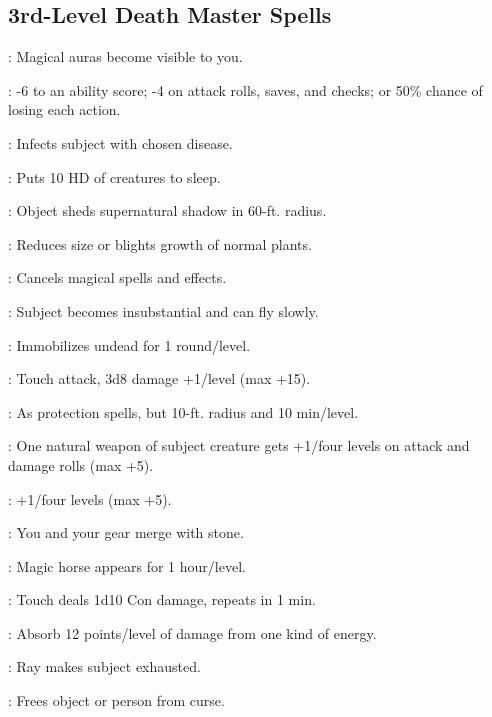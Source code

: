 \begin{multicols}{2}
\subsection{3rd-Level Death Master Spells}
\begin{description*}
\item[\linkspell{Arcane Sight}:] Magical auras become visible to you.
\item[\linkspell{Bestow Curse}:] -6 to an ability score; -4 on attack rolls, saves, and checks; or 50\% chance of losing each action.
\item[\linkspell{Contagion}:] Infects subject with chosen disease.
\item[\linkspell{Deep Slumber}:] Puts 10 HD of creatures to sleep.
\item[\linkspell{Deeper Darkness}:] Object sheds supernatural shadow in 60-ft. radius.
\item[\linkspell{Diminish Plants}:] Reduces size or blights growth of normal plants.
\item[\linkspell{Dispel Magic}:] Cancels magical spells and effects.
\item[\linkspell{Gaseous Form}:] Subject becomes insubstantial and can fly slowly.
\item[\linkspell{Halt Undead}:] Immobilizes undead for 1 round/level.
\item[\linkspell{Inflict Serious Wounds}:] Touch attack, 3d8 damage +1/level (max +15).
\item[\linkspell{Magic Circle Against Good}:] As protection spells, but 10-ft. radius and 10 min/level.
\item[\linkspell{Magic Fang, Greater}:] One natural weapon of subject creature gets +1/four levels on attack and damage rolls (max +5).
\item[\linkspell{Magic Weapon, Greater}:] +1/four levels (max +5).
\item[\linkspell{Meld into Stone}:] You and your gear merge with stone.
\item[\linkspell{Phantom Steed}:] Magic horse appears for 1 hour/level.
\item[\linkspell{Poison}:] Touch deals 1d10 Con damage, repeats in 1 min.
\item[\linkspell{Protection from Energy}:] Absorb 12 points/level of damage from one kind of energy.
\item[\linkspell{Ray of Exhaustion}:] Ray makes subject exhausted.
\item[\linkspell{Remove Curse}:] Frees object or person from curse.

\end{description*}
\end{multicols}
